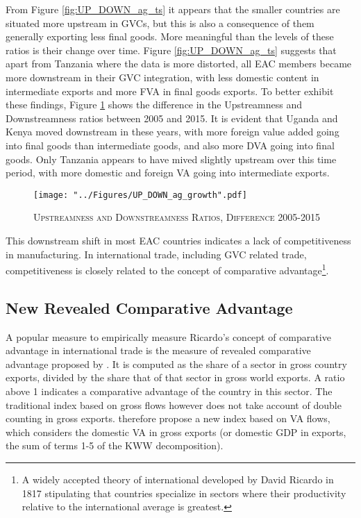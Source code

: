 \documentclass[a4paper]{article}
\begin{document}
From Figure \ref{fig:UP_DOWN_ag_ts} it appears that the smaller countries are situated more upstream in GVCs, but this is also a consequence of them generally exporting less final goods. More meaningful than the levels of these ratios is their change over time. Figure \ref{fig:UP_DOWN_ag_ts} suggests that apart from Tanzania where the data is more distorted, all EAC members became more downstream in their GVC integration, with less domestic content in intermediate exports and more FVA in final goods exports. To better exhibit these findings, Figure \ref{fig:UP_DOWN_ag_growth} shows the difference in the Upstreamness and Downstreamness ratios between 2005 and 2015. It is evident that Uganda and Kenya moved downstream in these years, with more foreign value added going into final goods than intermediate goods, and also more DVA going into final goods. %
Only Tanzania appears to have mived slightly upstream over this time period, with more domestic and foreign VA going into intermediate exports. 

\begin{figure}[h!]
\centering
\caption{\label{fig:UP_DOWN_ag_growth}\textsc{Upstreamness and Downstreamness Ratios, Difference 2005-2015}}
\texttt{[image: "../Figures/UP\_DOWN\_ag\_growth".pdf]} %
\end{figure}
\FloatBarrier

This downstream shift in most EAC countries indicates a lack of competitiveness in manufacturing. In international trade, including GVC related trade, competitiveness is closely related to the concept of comparative advantage\footnote{A widely accepted theory of international developed by David Ricardo in 1817 stipulating that countries specialize in sectors where their productivity relative to the international average is greatest.}. 

\subsection{New Revealed Comparative Advantage}
A popular measure to empirically measure Ricardo's concept of comparative advantage in international trade is the measure of revealed comparative advantage proposed by \citet{balassa1965trade}. It is computed as the share of a sector in gross country exports, divided by the share that of that sector in gross world exports. A ratio above 1 indicates a comparative advantage of the country in this sector. The traditional index based on gross flows however does not take account of double counting in gross exports. \citet{koopman2014tracing} therefore propose a new index based on VA flows, which considers the domestic VA in gross exports (or domestic GDP in exports, the sum of terms 1-5 of the KWW decomposition). \newline
\end{document}
